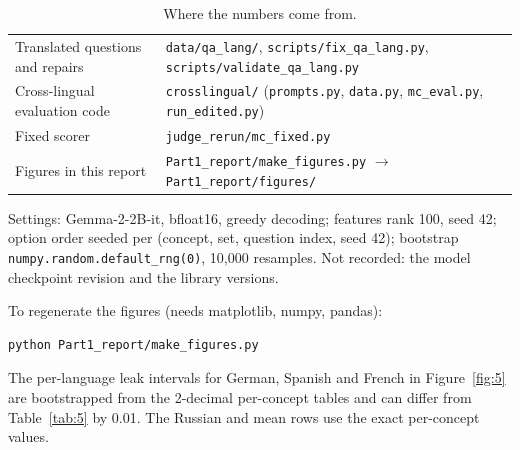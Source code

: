 \documentclass[11pt]{article}
\begin{document}
\begin{table}[t]
\begin{tabular}{@{}p{}p{}@{}}
Translated questions and repairs & \texttt{data/\allowbreak{}qa\_\allowbreak{}lang/\allowbreak{}}, \texttt{scripts/\allowbreak{}fix\_\allowbreak{}qa\_\allowbreak{}lang.py}, \texttt{scripts/\allowbreak{}validate\_\allowbreak{}qa\_\allowbreak{}lang.py} \\
Cross-lingual evaluation code & \texttt{crosslingual/\allowbreak{}} (\texttt{prompts.py}, \texttt{data.py}, \texttt{mc\_\allowbreak{}eval.py}, \texttt{run\_\allowbreak{}edited.py}) \\
Fixed scorer & \texttt{judge\_\allowbreak{}rerun/\allowbreak{}mc\_\allowbreak{}fixed.py} \\
Figures in this report & \texttt{Part1\_\allowbreak{}report/\allowbreak{}make\_\allowbreak{}figures.py} $\rightarrow$ \texttt{Part1\_\allowbreak{}report/\allowbreak{}figures/\allowbreak{}} \\
\bottomrule
\end{tabular}
\caption{Where the numbers come from.}
\label{tab:E}
\end{table}

Settings: Gemma-2-2B-it, bfloat16, greedy decoding; features rank 100, seed 42; option order seeded per (concept, set, question index, seed 42); bootstrap \texttt{numpy.random.default\_\allowbreak{}rng(0)}, 10,000 resamples. Not recorded: the model checkpoint revision and the library versions.

To regenerate the figures (needs matplotlib, numpy, pandas):

\begin{verbatim}
python Part1_report/make_figures.py
\end{verbatim}

The per-language leak intervals for German, Spanish and French in Figure~\ref{fig:5} are bootstrapped from the 2-decimal per-concept tables and can differ from Table~\ref{tab:5} by 0.01. The Russian and mean rows use the exact per-concept values.
\end{document}
